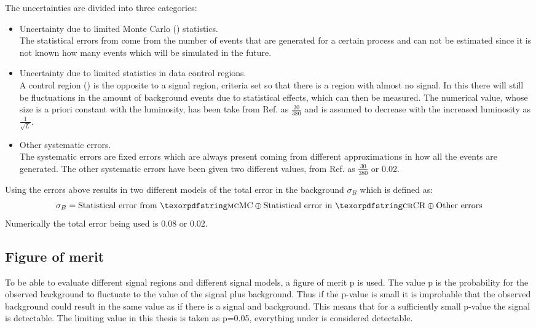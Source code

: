 The uncertainties are divided into three categories:
\begin{itemize}
\item Uncertainty due to limited Monte Carlo (\abbrMC) statistics. \\
The statistical errors from \abbrMC come from the number of events that are generated for a certain process and can not be estimated since it is not known how many events which will be simulated in the future.

\item Uncertainty due to limited statistics in data control regions.\\
A control region (\abbrCR) is the opposite to a signal region,  criteria set so that there is a region with almost no signal. In this \abbrCR there will still be fluctuations in the amount of background events due to statistical effects, which can then be measured. The numerical value, whose size is a priori constant with the luminosity, has been take from Ref. \citep{ATLAS-CONF-2012-147} as $\frac{30}{380}$ and is assumed to decrease with the increased luminosity as $\frac{1}{\sqrt{L}}$.

\item Other systematic errors.\\
The systematic errors are fixed errors which are always present coming from different approximations in how all the events are generated. The other systematic errors have been given two different values, from Ref. \citep{ATLAS-CONF-2012-147} as $\frac{30}{380}$ or 0.02.
\end{itemize}

Using the errors above results in two different models of the total error in the background $\sigma_B$ which is defined as:
\begin{equation*}
\sigma_B = \text{Statistical error from \abbrMC} \oplus \text{Statistical error in \abbrCR} \oplus \text{Other errors}
\end{equation*}
Numerically the total error being used is 0.08 or 0.02. 

\subsection{Figure of merit}\label{subsec:figmer}
To be able to evaluate different signal regions and different signal models, a figure of merit p is used. The value p is the probability for the observed background to fluctuate to the value of the signal plus background. Thus if the p-value is small it is improbable that the observed background could result in the same value as if there is a signal and background. This means that for a sufficiently small p-value the signal is detectable. The limiting value in this thesis is taken as p=0.05, everything under is considered detectable. 

